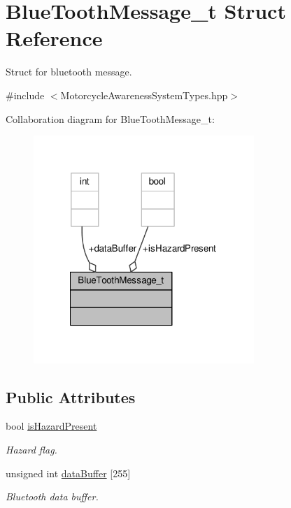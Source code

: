 \hypertarget{structBlueToothMessage__t}{\section{Blue\-Tooth\-Message\-\_\-t Struct Reference}
\label{structBlueToothMessage__t}
}


Struct for bluetooth message.  




{\ttfamily \#include $<$Motorcycle\-Awareness\-System\-Types.\-hpp$>$}



Collaboration diagram for Blue\-Tooth\-Message\-\_\-t\-:\nopagebreak
\begin{figure}[H]
\begin{center}
\leavevmode
\includegraphics[width=236pt]{structBlueToothMessage__t__coll__graph}
\end{center}
\end{figure}
\subsection*{Public Attributes}
\begin{DoxyCompactItemize}
\item 
bool \hyperlink{structBlueToothMessage__t_a2dd315aa1cba1d2d3045e26b9f171e61}{is\-Hazard\-Present}
\begin{DoxyCompactList}\small\item\em Hazard flag. \end{DoxyCompactList}\item 
unsigned int \hyperlink{structBlueToothMessage__t_ab872789a32f068dae8bcf77122256b78}{data\-Buffer} \mbox{[}255\mbox{]}
\begin{DoxyCompactList}\small\item\em Bluetooth data buffer. \end{DoxyCompactList}\end{DoxyCompactItemize}


